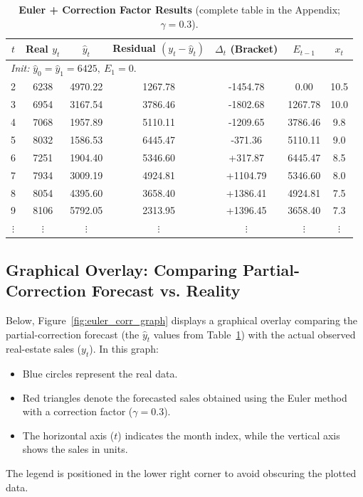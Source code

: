 \documentclass{article}
\begin{document}
\begin{table}[H]
\centering
\begin{tabular}{ccccccc}
\toprule
\(t\) & Real \(y_t\) & \(\hat{y}_t\) & Residual \((y_t-\hat{y}_t)\) & \(\Delta_t\) {\footnotesize (Bracket)} & \(E_{t-1}\) & \(x_t\)\\
\midrule
\multicolumn{7}{l}{\textit{Init: } \(\hat{y}_0=\hat{y}_1=6425,\ E_1=0.\)}\\
2 & 6238 & 4970.22 & 1267.78 & -1454.78 & 0.00  & 10.5\\
3 & 6954 & 3167.54 & 3786.46 & -1802.68 & 1267.78 & 10.0\\
4 & 7068 & 1957.89 & 5110.11 & -1209.65 & 3786.46 & 9.8\\
5 & 8032 & 1586.53 & 6445.47 & -371.36  & 5110.11 & 9.0\\
6 & 7251 & 1904.40 & 5346.60 & +317.87  & 6445.47 & 8.5\\
7 & 7934 & 3009.19 & 4924.81 & +1104.79 & 5346.60 & 8.0\\
8 & 8054 & 4395.60 & 3658.40 & +1386.41 & 4924.81 & 7.5\\
9 & 8106 & 5792.05 & 2313.95 & +1396.45 & 3658.40 & 7.3\\
\(\vdots\) & \(\vdots\) & \(\vdots\) & \(\vdots\) & \(\vdots\) & \(\vdots\) & \(\vdots\)\\
\bottomrule
\end{tabular}
\caption{\textbf{Euler + Correction Factor Results} (complete table in the Appendix; \(\gamma=0.3\)).}
\label{tab:euler_corr_24}
\end{table}

\subsection{Graphical Overlay: Comparing Partial-Correction Forecast vs. Reality}

Below, Figure~\ref{fig:euler_corr_graph} displays a graphical overlay comparing the partial-correction forecast (the \(\hat{y}_t\) values from Table~\ref{tab:euler_corr_24}) with the actual observed real-estate sales (\(y_t\)). In this graph:
\begin{itemize}
    \item Blue circles represent the real data.
    \item Red triangles denote the forecasted sales obtained using the Euler method with a correction factor (\(\gamma=0.3\)).
    \item The horizontal axis (\(t\)) indicates the month index, while the vertical axis shows the sales in units.
\end{itemize}
The legend is positioned in the lower right corner to avoid obscuring the plotted data.
\end{document}
